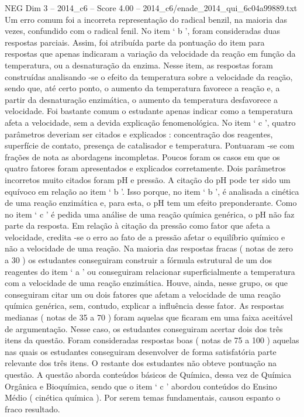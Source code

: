 \begin{textsample}{NEG Dim 3 – 2014\_c6 – Score 4.00 – 2014\_c6/enade\_2014\_qui\_6c04a99889.txt}
Um erro comum foi a incorreta representação do radical benzil, na maioria das vezes, confundido com o radical fenil.
No item ‘ b ’, foram consideradas duas respostas parciais.
Assim, foi atribuída parte da pontuação do item para respostas que apenas indicaram a variação da velocidade da reação em função da temperatura, ou a desnaturação da enzima.
Nesse item, as respostas foram construídas analisando -se o efeito da temperatura sobre a velocidade da reação, sendo que, até certo ponto, o aumento da temperatura favorece a reação e, a partir da desnaturação enzimática, o aumento da temperatura desfavorece a velocidade.
Foi bastante comum o estudante apenas indicar como a temperatura afeta a velocidade, sem a devida explicação fenomenológica.
No item ‘ c ’, quatro parâmetros deveriam ser citados e explicados : concentração dos reagentes, superfície de contato, presença de catalisador e temperatura.
Pontuaram -se com frações de nota as abordagens incompletas.
Poucos foram os casos em que os quatro fatores foram apresentados e explicados corretamente.
Dois parâmetros incorretos muito citados foram pH e pressão.
A citação do pH pode ter sido um equívoco em relação ao item ‘ b ’.
Isso porque, no item ‘ b ’, é analisada a cinética de uma reação enzimática e, para esta, o pH tem um efeito preponderante.
Como no item ‘ c ’ é pedida uma análise de uma reação química genérica, o pH não faz parte da resposta.
Em relação à citação da pressão como fator que afeta a velocidade, credita -se o erro ao fato de a pressão afetar o equilíbrio químico e não a velocidade de uma reação.
Na maioria das respostas fracas ( notas de zero a 30 ) os estudantes conseguiram construir a fórmula estrutural de um dos reagentes do item ‘ a ’ ou conseguiram relacionar superficialmente a temperatura com a velocidade de uma reação enzimática.
Houve, ainda, nesse grupo, os que conseguiram citar um ou dois fatores que afetam a velocidade de uma reação química genérica, sem, contudo, explicar a influência desse fator.
As respostas medianas ( notas de 35 a 70 ) foram aquelas que ficaram em uma faixa aceitável de argumentação.
Nesse caso, os estudantes conseguiram acertar dois dos três itens da questão.
Foram consideradas respostas boas ( notas de 75 a 100 ) aquelas nas quais os estudantes conseguiram desenvolver de forma satisfatória parte relevante dos três itens.
O restante dos estudantes não obteve pontuação na questão.
A questão aborda conteúdos básicos de Química, dessa vez de Química Orgânica e Bioquímica, sendo que o item ‘ c ’ abordou conteúdos do Ensino Médio ( cinética química ).
Por serem temas fundamentais, causou espanto o fraco resultado.

\end{textsample}
